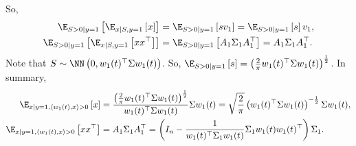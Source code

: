 \documentclass{article}
\begin{document}
\newpage
So,
\begin{align}
  \E_{S > 0 \mid y = 1} \left[ \E_{x \mid S, y = 1}\left[ x \right] \right]
  &= \E_{S > 0 \mid y = 1} \left[ s v_1 \right] 
  = \E_{S > 0 \mid y = 1} \left[ s \right] v_1, \\
  \E_{S > 0 \mid y = 1} \left[ \E_{x \mid S, y = 1}\left[ x x^\top \right] \right]
  &= \E_{S > 0 \mid y = 1} \left[ A_1 \Sigma_1 A_1^\top \right]
  = A_1 \Sigma_1 A_1^\top.
\end{align}
Note that $S \sim \NN\left( 0, w_1(t)^\top \Sigma w_1(t) \right)$.
So, $\E_{S > 0 \mid y = 1} \left[ s \right] = \left( \frac{2}{\pi} w_1(t)^\top \Sigma w_1(t) \right)^{\frac{1}{2}}$.
In summary,
\begin{align}
  \E_{x \mid y = 1, \langle w_1(t), x \rangle > 0} \left[ x \right]
  &= \frac{ \left( \frac{2}{\pi} w_1(t)^\top \Sigma w_1(t) \right)^{\frac{1}{2}} }{ w_1(t)^\top \Sigma w_1(t) } \Sigma w_1(t)
  = \sqrt{ \frac{2}{\pi} } \left( w_1(t)^\top \Sigma w_1(t) \right)^{-\frac{1}{2}} \Sigma w_1(t), \\
  \E_{x \mid y = 1, \langle w_1(t), x \rangle > 0} \left[ x x^\top \right]
  &= A_1 \Sigma_1 A_1^\top
  = \left( I_n - \frac{1}{w_1(t)^\top \Sigma_1 w_1(t)} \Sigma_1 w_1(t) w_1(t)^\top \right) \Sigma_1.
\end{align}
\end{document}

